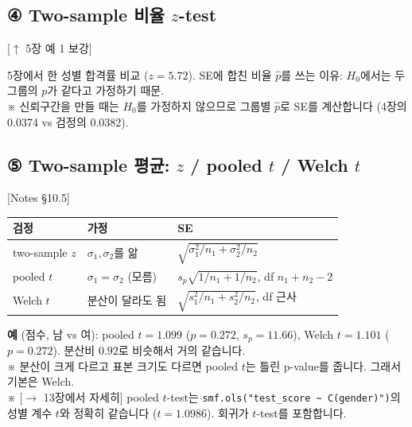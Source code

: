 \documentclass[11pt,a4paper]{article}
\newcommand{\code}[1]{\texttt{#1}}
\newcommand{\nref}[1]{{\footnotesize\textsf{\color{blue!55!black}[Notes #1]}}}
\newcommand{\aside}[1]{{\footnotesize\color{black!65}#1}}
\newcommand{\linkup}[1]{{\footnotesize\textsf{\color{green!40!black}[$\uparrow$ #1 보강]}}}
\newcommand{\fwd}[1]{{\footnotesize\textsf{\color{green!40!black}[$\to$ #1에서 자세히]}}}
\begin{document}
\subsection*{④ Two-sample 비율 $z$-test} \linkup{5장 예 1}
5장에서 한 성별 합격률 비교 ($z=5.72$). SE에 합친 비율 $\hat p$를 쓰는 이유: $H_0$에서는 두 그룹의 $p$가 같다고 가정하기 때문.\\
\aside{※ 신뢰구간을 만들 때는 $H_0$를 가정하지 않으므로 그룹별 $\hat p$로 SE를 계산합니다 (4장의 0.0374 vs 검정의 0.0382).}

\subsection*{⑤ Two-sample 평균: $z$ / pooled $t$ / Welch $t$} \nref{§10.5}
\begin{center}
\begin{tabular}{@{}l l l@{}}
\toprule
검정 & 가정 & SE \\
\midrule
two-sample $z$ & $\sigma_1,\sigma_2$를 앎 & $\sqrt{\sigma_1^2/n_1+\sigma_2^2/n_2}$ \\
pooled $t$ & $\sigma_1=\sigma_2$ (모름) & $s_p\sqrt{1/n_1+1/n_2}$, df $n_1+n_2-2$ \\
Welch $t$ & 분산이 달라도 됨 & $\sqrt{s_1^2/n_1+s_2^2/n_2}$, df 근사 \\
\bottomrule
\end{tabular}
\end{center}
\textbf{예} (점수, 남 vs 여): pooled $t=1.099$ ($p=0.272$, $s_p=11.66$), Welch $t=1.101$ ($p=0.272$). 분산비 $0.92$로 비슷해서 거의 같습니다.\\
\aside{※ 분산이 크게 다르고 표본 크기도 다르면 pooled $t$는 틀린 p-value를 줍니다. 그래서 기본은 Welch.}\\
\aside{※ \fwd{13장} pooled $t$-test는 \code{smf.ols("test\_score \~{} C(gender)")}의 성별 계수 $t$와 정확히 같습니다 ($t=1.0986$). 회귀가 $t$-test를 포함합니다.}
\end{document}

